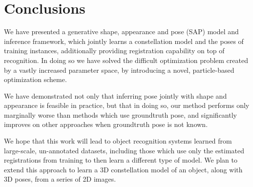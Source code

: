\section{Conclusions}
\label{sec:conclusions}
We have presented a generative shape, appearance and pose (SAP) model and inference framework, which jointly learns a constellation model and the poses of training instances, additionally providing registration capability on top of recognition. In doing so we have solved the difficult optimization problem created by a vastly increased parameter space, by introducing a novel, particle-based optimization scheme.

We have demonstrated not only that inferring pose jointly with shape and appearance is feasible in practice, but that in doing so, our method performs only marginally worse than methods which use groundtruth pose, and significantly improves on other approaches when groundtruth pose is not known.

We hope that this work will lead to object recognition systems learned from large-scale, un-annotated datasets, including those which use only the estimated registrations from training to then learn a different type of model. We plan to extend this approach to learn a 3D constellation model of an object, along with 3D poses, from a series of 2D images.
